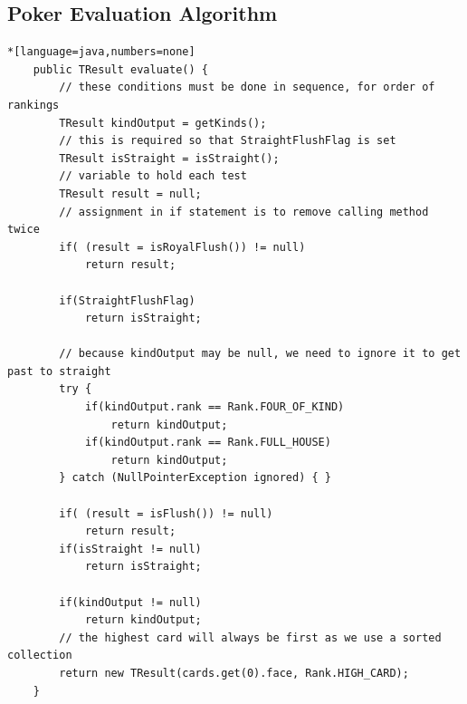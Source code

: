 \documentclass[11pt]{article}
\begin{document}
\newpage
\subsection{Poker Evaluation Algorithm}
\hypertarget{app_eval}{}
\begin{lstlisting}*[language=java,numbers=none]
    public TResult evaluate() {
        // these conditions must be done in sequence, for order of rankings
        TResult kindOutput = getKinds();
        // this is required so that StraightFlushFlag is set
        TResult isStraight = isStraight();
        // variable to hold each test
        TResult result = null;
        // assignment in if statement is to remove calling method twice
        if( (result = isRoyalFlush()) != null)
            return result;

        if(StraightFlushFlag)
            return isStraight;

        // because kindOutput may be null, we need to ignore it to get past to straight
        try {
            if(kindOutput.rank == Rank.FOUR_OF_KIND)
                return kindOutput;
            if(kindOutput.rank == Rank.FULL_HOUSE)
                return kindOutput;
        } catch (NullPointerException ignored) { }

        if( (result = isFlush()) != null)
            return result;
        if(isStraight != null)
            return isStraight;
       
        if(kindOutput != null)
            return kindOutput;
        // the highest card will always be first as we use a sorted collection
        return new TResult(cards.get(0).face, Rank.HIGH_CARD);
    }
\end{lstlisting}


\newpage
\end{document}

